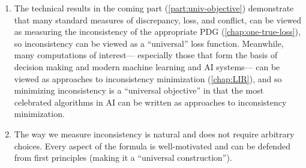 {\begin{enumerate}
\item
The technical results in the coming part (\cref{part:univ-objective}) demonstrate that
many standard measures of discrepancy, loss, and conflict, can be viewed as measuring the inconsistency of the appropriate PDG (\cref{chap:one-true-loss}), 
    so inconsistency can be viewed as a ``universal'' loss function.
Meanwhile, many computations of interest---%
especially those that form the basis of decision making and modern machine learning and AI systems---%
can be viewed as approaches to inconsistency minimization
    (\cref{chap:LIR}),
    and so minimizing inconsistency is a ``universal objective'' in that the most celebrated algorithms in AI can be written as approaches to inconsistency minimization.

\item 
The way we measure inconsistency is natural and does not require arbitrary choices. Every aspect of the formula is well-motivated and can be defended from first principles (making it a ``universal construction''). 
\end{enumerate} 


}
